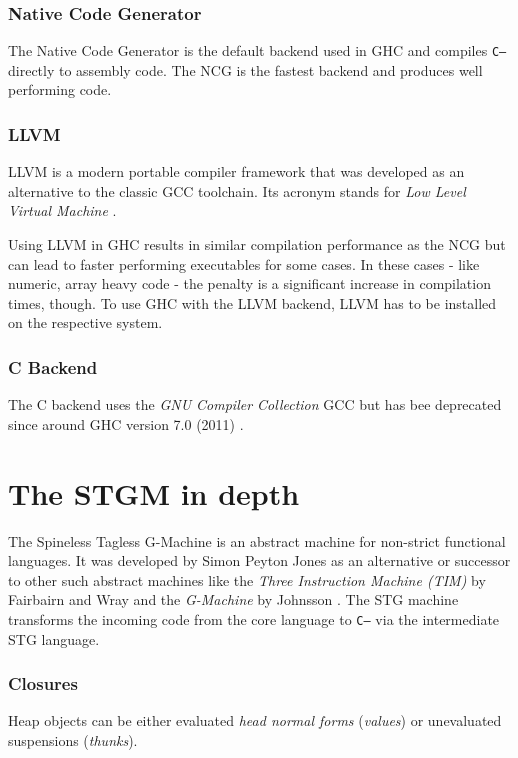 \documentclass[runningheads]{llncs}
\begin{document}
\subsubsection{Native Code Generator}
The Native Code Generator is the default backend used in GHC and compiles \texttt{C--} directly to assembly code. The NCG is the fastest backend and produces well performing code. \cite{GHCmanual}

\subsubsection{LLVM}
LLVM is a modern portable compiler framework that was developed as an alternative to the classic GCC toolchain. Its acronym stands for \textit{Low Level Virtual Machine} \cite{lattner2004llvm}.

Using LLVM in GHC results in similar compilation performance as the NCG but can lead to faster performing executables for some cases. In these cases - like numeric, array heavy code - the penalty is a significant increase in compilation times, though. To use GHC with the LLVM backend, LLVM has to be installed on the respective system.\cite{GHCmanual}

\subsubsection{C Backend}
The C backend uses the \textit{GNU Compiler Collection} GCC but has bee deprecated since around GHC version 7.0 (2011) \cite{GHCmanual}.





\section{The STGM in depth}
\label{sec:stgm}

The Spineless Tagless G-Machine is an abstract machine for non-strict functional languages.
It was developed by Simon Peyton Jones as an alternative or successor to other such abstract machines like the \textit{Three Instruction Machine (TIM)} by Fairbairn and Wray \cite{fairbairn1987tim} and the \textit{G-Machine} by Johnsson \cite{johnsson1984efficient}.
The STG machine transforms the incoming code from the core language to \texttt{C--} via the intermediate STG language.






\subsubsection{Closures}
Heap objects can be either evaluated \textit{head normal forms} (\textit{values}) or unevaluated suspensions (\textit{thunks}).
\end{document}
